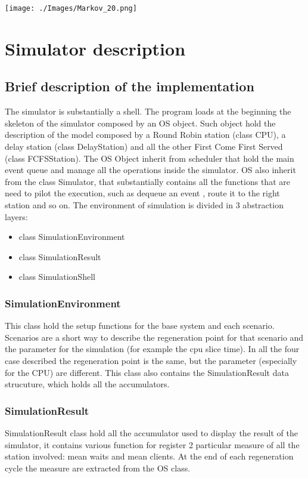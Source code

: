 \documentclass[12pt,a4paper]{article}
\begin{document}
\texttt{[image: ./Images/Markov\_20.png]}


\section{Simulator description}
\subsection{Brief description of the implementation}
The simulator is substantially a shell. The program loads at the beginning the skeleton of the simulator composed by an OS object. Such object hold the description of the model composed by a Round Robin station (class CPU), a delay station (class DelayStation) and all the other First Come First Served (class FCFSStation). The OS Object inherit from scheduler that hold the main event queue and manage all the operations inside the simulator. OS also inherit from the class Simulator, that substantially contains all the functions that are need to pilot the execution, such as dequeue an event , route it to the right station and so on. The environment of simulation is divided in 3 abstraction layers:
\begin{itemize}
    \item class SimulationEnvironment
    \item class SimulationResult
    \item class SimulationShell
\end{itemize}
\subsubsection{SimulationEnvironment}
This class hold the setup functions for the base system and each scenario. Scenarios are a short way to describe the regeneration point for that scenario and the parameter for the simulation (for example the cpu slice time). In all the four case described the regeneration point is the same, but the parameter (especially for the CPU) are different. This class also contains the SimulationResult data strucuture, which holds all the accumulators.
\subsubsection{SimulationResult}
SimulationResult class hold all the accumulator used to display the result of the simulator, it contains various function for register 2 particular measure of all the station involved: mean waits and mean clients. At the end of each regeneration cycle the measure are extracted from the OS class.
\end{document}
